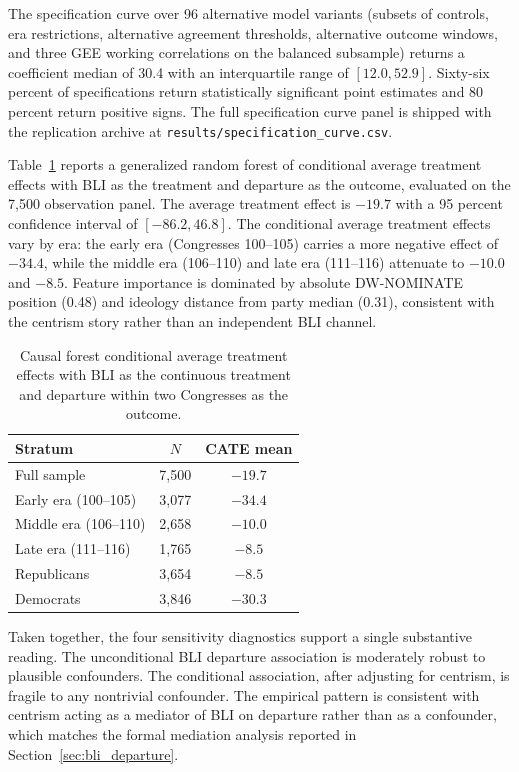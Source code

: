 \documentclass[12pt, a4paper]{article}
\begin{document}
The specification curve over 96 alternative model variants (subsets of controls, era restrictions, alternative agreement thresholds, alternative outcome windows, and three GEE working correlations on the balanced subsample) returns a coefficient median of 30.4 with an interquartile range of $[12.0, 52.9]$. Sixty-six percent of specifications return statistically significant point estimates and 80 percent return positive signs. The full specification curve panel is shipped with the replication archive at \texttt{results/specification\_curve.csv}.

Table~\ref{tab:cforest} reports a generalized random forest of conditional average treatment effects with BLI as the treatment and departure as the outcome, evaluated on the 7,500 observation panel. The average treatment effect is $-19.7$ with a 95 percent confidence interval of $[-86.2, 46.8]$. The conditional average treatment effects vary by era: the early era (Congresses 100--105) carries a more negative effect of $-34.4$, while the middle era (106--110) and late era (111--116) attenuate to $-10.0$ and $-8.5$. Feature importance is dominated by absolute DW-NOMINATE position (0.48) and ideology distance from party median (0.31), consistent with the centrism story rather than an independent BLI channel.

\begin{table}[H]
\centering
\caption{Causal forest conditional average treatment effects with BLI as the continuous treatment and departure within two Congresses as the outcome.}
\label{tab:cforest}
\small
\begin{tabular}{lcc}
\toprule
Stratum & $N$ & CATE mean \\
\midrule
Full sample & 7,500 & $-19.7$ \\
Early era (100--105) & 3,077 & $-34.4$ \\
Middle era (106--110) & 2,658 & $-10.0$ \\
Late era (111--116) & 1,765 & $-8.5$ \\
Republicans & 3,654 & $-8.5$ \\
Democrats & 3,846 & $-30.3$ \\
\bottomrule
\end{tabular}
\end{table}

Taken together, the four sensitivity diagnostics support a single substantive reading. The unconditional BLI departure association is moderately robust to plausible confounders. The conditional association, after adjusting for centrism, is fragile to any nontrivial confounder. The empirical pattern is consistent with centrism acting as a mediator of BLI on departure rather than as a confounder, which matches the formal mediation analysis reported in Section~\ref{sec:bli_departure}.
\end{document}
